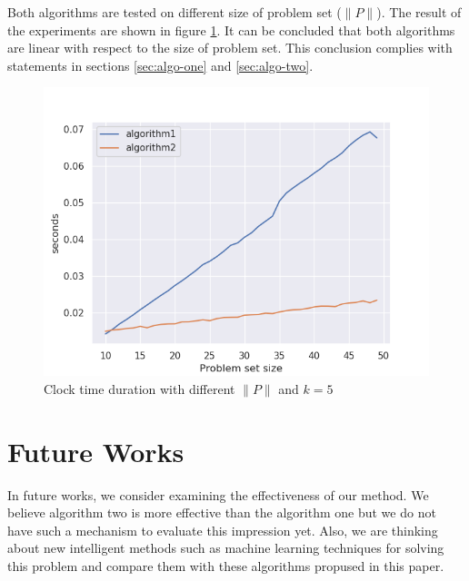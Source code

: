 \documentclass{template}
\begin{document}
Both algorithms are tested on different size of problem set (\(\lVert P \rVert\)). The result
of the experiments are shown in figure \ref{fig:p-comparison}. It can be concluded that both 
algorithms are linear with respect to the size of problem set. This conclusion complies with
statements in sections \ref{sec:algo-one} and \ref{sec:algo-two}.

\begin{figure}
    \includegraphics[width=\linewidth]{./images/algo1_algo2_diff_p_sns.png}
    \caption{Clock time duration with different \(\lVert P \rVert\) and \(k=5\)}
    \label{fig:p-comparison}
\end{figure}


\section{Future Works}
\label{sec:f-work}
In future works, we consider examining the effectiveness of our method. We believe algorithm 
two is more effective than the algorithm one but we do not have such a mechanism to evaluate this 
impression yet. Also, we are thinking about new intelligent methods such as machine learning 
techniques for solving this problem and compare them with these algorithms propused in this paper. 
\end{document}
